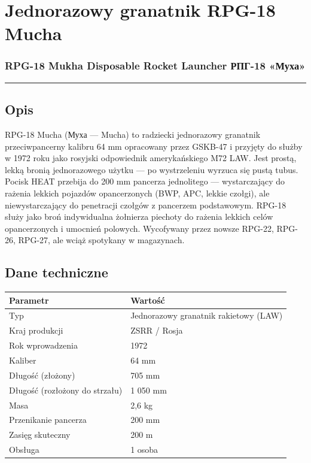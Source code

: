 \documentclass[12pt,openany,oneside]{book}
\begin{document}
\chapter{Jednorazowy granatnik RPG-18
Mucha}\label{jednorazowy-granatnik-rpg-18-mucha}

\subsection{RPG-18 Mukha Disposable Rocket Launcher \textbar{} РПГ-18
«Муха»}\label{rpg-18-mukha-disposable-rocket-launcher-ux440ux43fux433-18-ux43cux443ux445ux430}

\begin{center}\rule{0.5\linewidth}{0.5pt}\end{center}

\section{Opis}\label{opis-69}

RPG-18 Mucha (Муха --- Mucha) to radziecki jednorazowy granatnik
przeciwpancerny kalibru 64 mm opracowany przez GSKB-47 i przyjęty do
służby w 1972 roku jako rosyjski odpowiednik amerykańskiego M72 LAW.
Jest prostą, lekką bronią jednorazowego użytku --- po wystrzeleniu
wyrzuca się pustą tubus. Pocisk HEAT przebija do 200 mm pancerza
jednolitego --- wystarczający do rażenia lekkich pojazdów opancerzonych
(BWP, APC, lekkie czołgi), ale niewystarczający do penetracji czołgów z
pancerzem podstawowym. RPG-18 służy jako broń indywidualna żołnierza
piechoty do rażenia lekkich celów opancerzonych i umocnień polowych.
Wycofywany przez nowsze RPG-22, RPG-26, RPG-27, ale wciąż spotykany w
magazynach.

\section{Dane techniczne}\label{dane-techniczne-69}

\begin{longtable}[]{@{}ll@{}}
\toprule\noalign{}
Parametr & Wartość \\
\midrule\noalign{}
\endhead
\bottomrule\noalign{}
\endlastfoot
Typ & Jednorazowy granatnik rakietowy (LAW) \\
Kraj produkcji & ZSRR / Rosja \\
Rok wprowadzenia & 1972 \\
Kaliber & 64 mm \\
Długość (złożony) & 705 mm \\
Długość (rozłożony do strzału) & 1 050 mm \\
Masa & 2,6 kg \\
Przenikanie pancerza & 200 mm \\
Zasięg skuteczny & 200 m \\
Obsługa & 1 osoba \\
\end{longtable}
\end{document}
